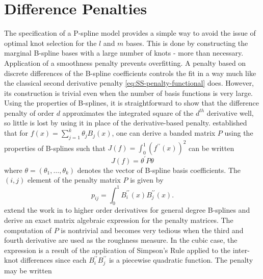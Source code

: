 
\section{Difference Penalties}

The specification of a P-spline model provides a simple way to avoid the issue of optimal knot selection for the $l$ and $m$ bases. This is done by constructing the marginal B-spline bases with a large number of knots - more than necessary. Application of a smoothness penalty prevents overfitting. A penalty based on discrete differences of the B-spline coefficients controls the fit in a way much like the classical second derivative penalty \eqref{eq:SS-penalty-functional} does. However, its construction is trivial even when the number of basis functions is very large. Using the properties of B-splines, it is straightforward to show that the difference penalty of order $d$ approximates the integrated square of the $d^{th}$ derivative well, so little is lost by using it in place of the derivative-based penalty. \cite{o1986statistical} established that for $f\left(x\right) = \sum\limits_{j=1}^k \theta_j B_j\left(x\right)$, one can derive a banded matrix $P$ using the properties of B-splines such that $J\left(f\right) = \int_0^1 \left( f^{\prime \prime}\left(x\right)\right)^2$ can be written
 \[
J\left(f\right) = \theta^\prime P \theta
 \] 
\noindent
where $\theta = \left(\theta_1,\dots, \theta_k\right)$ denotes the vector of B-spline basis coefficients. The $\left(i,j\right)$ element of the penalty matrix $P$ is given by
 \[
 p_{ij} = \int_0^1 B_i^{\prime \prime}\left(x\right) B_j^{\prime \prime}\left(x\right).
 \]
\cite{wand2008semiparametric} extend the work in \cite{o1986statistical} to higher order derivatives for general degree B-splines and derive an exact matrix algebraic expression for the penalty matrices.  The computation of $P$ is nontrivial and becomes very tedious when the third and fourth derivative are used as the roughness measure. In the cubic case, the expression is a result of the application of Simpson's Rule applied to the inter-knot differences since each $B_i^{\prime \prime} B_j^{\prime \prime}$ is a piecewise quadratic function. The penalty may be written
